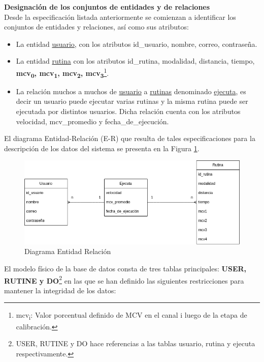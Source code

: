 \textbf{Designación de los conjuntos de entidades y de relaciones}\\
Desde la especificación listada anteriormente se comienzan a
identificar los conjuntos de entidades y relaciones, así como sus atributos:
\begin{itemize}
    \item La entidad \underline{usuario}, con los atributos id\_usuario, nombre, correo, contraseña.
    \item La entidad \underline{rutina} con los atributos id\_rutina, modalidad, distancia, tiempo, \textbf{mcv\textsubscript{0}, mcv\textsubscript{1}, mcv\textsubscript{2}, mcv\textsubscript{3}}\footnote{mcv\textsubscript{i}: Valor porcentual definido de MCV en el canal i luego de la etapa de calibración.}.
    \item La relación muchos a muchos de \underline{usuario} a \underline{rutinas} denominado \underline{ejecuta}, es decir un usuario puede ejecutar 
    varias rutinas y la misma rutina puede ser ejecutada por distintos usuarios. Dicha relación cuenta con los atributos velocidad, mcv\_promedio y fecha\_de\_ejecución. 
\end{itemize}
    
El diagrama Entidad-Relación (E-R) que resulta de tales especificaciones para la descripción de los datos del sistema se presenta en la Figura \ref{fig: diagram-er}.
\begin{figure}[ht]
    \centering
    \includegraphics[scale=0.48]{images/diagram-er.png}
    \caption{Diagrama Entidad Relación}
    \label{fig: diagram-er}
\end{figure}

El modelo físico de la base de datos consta de tres tablas principales: \textbf{USER, RUTINE y DO}\footnote{USER, RUTINE y DO hace referencias a las tablas usuario, rutina y ejecuta respectivamente.} en las que se han definido las siguientes restricciones para mantener la integridad de los datos:

